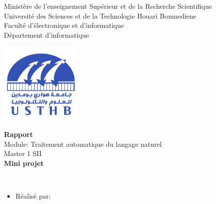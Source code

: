 \documentclass[12pt , a4paper]{report}
\begin{document}
\begin{center}
\normalsize{Ministère de l'enseignement Supérieur et de la Recherche Scientifique}\\
\normalsize{Université des Sciences et de la Technologie Houari Boumediene}\\
\normalsize{Faculté d'électronique et d'informatique}\\
\normalsize{Département d'informatique}\\
\end{center}
\begin{center}
\includegraphics[width=4cm,height=4cm]{usthb.png}
\end{center}

\begin{center}
\Huge{\textbf{Rapport}}\\
\vspace{0.7cm}
\large{Module: Traitement automatique du langage naturel}\\
\vspace{0.2cm}
\large{Master 1 SII}\\
\vspace{1.5cm}
\normalsize{\textbf{Mini projet}}
\end{center}
\vspace{3cm}
\\
\begin{itemize}
    \item{Réalisé par:}
\end{itemize}

\vspace{1cm}
\end{document}
